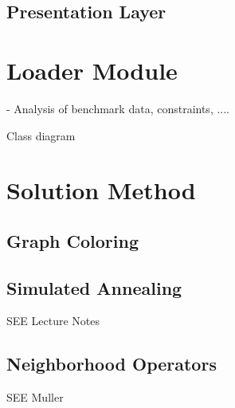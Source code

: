\subsection{Presentation Layer}



\section{Loader Module}

- Analysis of benchmark data, constraints, ....

Class diagram


\section{Solution Method}

\subsection{Graph Coloring}

\subsection{Simulated Annealing}

SEE Lecture Notes

\subsection{Neighborhood Operators}

SEE Muller









